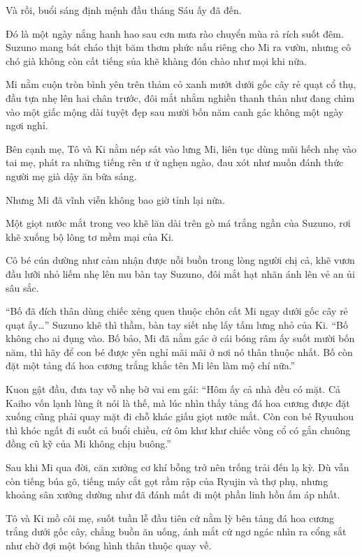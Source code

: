 \documentclass[../main.tex]{subfiles}
\begin{document}
Và rồi, buổi sáng định mệnh đầu tháng Sáu ấy đã đến.

Đó là một ngày nắng hanh hao sau cơn mưa rào chuyển mùa rả rích suốt đêm. Suzuno mang bát cháo thịt băm thơm phức nấu riêng cho Mi ra vườn, nhưng cô chó già không còn cất tiếng sủa khẽ khàng đón chào như mọi khi nữa.

Mi nằm cuộn tròn bình yên trên thảm cỏ xanh mướt dưới gốc cây rẻ quạt cổ thụ, đầu tựa nhẹ lên hai chân trước, đôi mắt nhắm nghiền thanh thản như đang chìm vào một giấc mộng dài tuyệt đẹp sau mười bốn năm canh gác không một ngày ngơi nghỉ.

Bên cạnh mẹ, Tô và Ki nằm nép sát vào lưng Mi, liên tục dùng mũi hếch nhẹ vào tai mẹ, phát ra những tiếng rên ư ử nghẹn ngào, đau xót như muốn đánh thức người mẹ già dậy ăn bữa sáng.

Nhưng Mi đã vĩnh viễn không bao giờ tỉnh lại nữa.

Một giọt nước mắt trong veo khẽ lăn dài trên gò má trắng ngần của Suzuno, rơi khẽ xuống bộ lông tơ mềm mại của Ki.

Cô bé cún dường như cảm nhận được nỗi buồn trong lòng người chị cả, khẽ vươn đầu lưỡi nhỏ liếm nhẹ lên mu bàn tay Suzuno, đôi mắt hạt nhãn ánh lên vẻ an ủi sâu sắc.

``Bố đã đích thân dùng chiếc xẻng quen thuộc chôn cất Mi ngay dưới gốc cây rẻ quạt ấy\dots'' Suzuno khẽ thì thầm, bàn tay siết nhẹ lấy tấm lưng nhỏ của Ki. ``Bố không cho ai đụng vào. Bố bảo, Mi đã nằm gác ở cái bóng râm ấy suốt mười bốn năm, thì hãy để con bé được yên nghỉ mãi mãi ở nơi nó thân thuộc nhất. Bố còn đặt một tảng đá hoa cương trắng khắc tên Mi lên làm mộ chí nữa.''

Kuon gật đầu, đưa tay vỗ nhẹ bờ vai em gái: ``Hôm ấy cả nhà đều có mặt. Cả Kaiho vốn lạnh lùng ít nói là thế, mà lúc nhìn thấy tảng đá hoa cương được đặt xuống cũng phải quay mặt đi chỗ khác giấu giọt nước mắt. Còn con bé Ryuuhou thì khóc ngất đi suốt cả buổi chiều, cứ ôm khư khư chiếc vòng cổ có gắn chuông đồng cũ kỹ của Mi không chịu buông.''

Sau khi Mi qua đời, căn xưởng cơ khí bỗng trở nên trống trải đến lạ kỳ. Dù vẫn còn tiếng búa gõ, tiếng máy cắt gọt rầm rập của Ryujin và thợ phụ, nhưng khoảng sân xưởng dường như đã đánh mất đi một phần linh hồn ấm áp nhất.

Tô và Ki mồ côi mẹ, suốt tuần lễ đầu tiên cứ nằm lỳ bên tảng đá hoa cương trắng dưới gốc cây, chẳng buồn ăn uống, ánh mắt cứ ngơ ngác nhìn ra cổng sắt như chờ đợi một bóng hình thân thuộc quay về.
\end{document}
